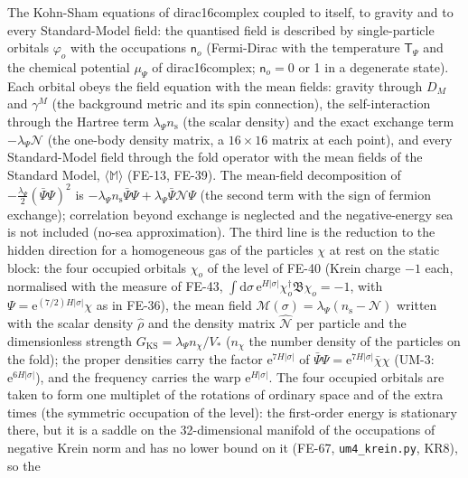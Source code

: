 \documentclass[
  10pt,
]{article}
\begin{document}
The Kohn-Sham equations of dirac16complex coupled to itself, to gravity
and to every Standard-Model field: the quantised field is described by
single-particle orbitals \(\varphi_o\) with the occupations
\(\mathsf{n}_o\) (Fermi-Dirac with the temperature \(\mathsf{T}_\Psi\)
and the chemical potential \(\mu_\Psi\) of dirac16complex;
\(\mathsf{n}_o = 0\) or 1 in a degenerate state). Each orbital obeys the
field equation with the mean fields: gravity through \(D_M\) and
\(\gamma^M\) (the background metric and its spin connection), the
self-interaction through the Hartree term
\(\lambda_\Psi n_{\mathrm{s}}\) (the scalar density) and the exact
exchange term \(-\lambda_\Psi\mathcal{N}\) (the one-body density matrix,
a \(16 \times 16\) matrix at each point), and every Standard-Model field
through the fold operator with the mean fields of the Standard Model,
\(\langle\mathbb{M}\rangle\) (FE-13, FE-39). The mean-field
decomposition of \(-\frac{\lambda_\Psi}{2}(\bar\Psi\Psi)^2\) is
\(-\lambda_\Psi n_{\mathrm{s}}\bar\Psi\Psi + \lambda_\Psi\bar\Psi\mathcal{N}\Psi\)
(the second term with the sign of fermion exchange); correlation beyond
exchange is neglected and the negative-energy sea is not included
(no-sea approximation). The third line is the reduction to the hidden
direction for a homogeneous gas of the particles \(\chi\) at rest on the
static block: the four occupied orbitals \(\chi_o\) of the level of
FE-40 (Krein charge \(-1\) each, normalised with the measure of FE-43,
\(\int\mathrm{d}\sigma\,\mathrm{e}^{H\lvert\sigma\rvert}\chi_o^\dagger\mathfrak{B}\chi_o = -1\),
with \(\Psi = \mathrm{e}^{(7/2)H\lvert\sigma\rvert}\chi\) as in FE-36),
the mean field
\(\mathcal{M}(\sigma) = \lambda_\Psi(n_{\mathrm{s}} - \mathcal{N})\)
written with the scalar density \(\hat\rho\) and the density matrix
\(\hat{\mathcal{N}}\) per particle and the dimensionless strength
\(G_{\mathrm{KS}} = \lambda_\Psi n_\chi/V_*\) (\(n_\chi\) the number
density of the particles on the fold); the proper densities carry the
factor \(\mathrm{e}^{7H\lvert\sigma\rvert}\) of
\(\bar\Psi\Psi = \mathrm{e}^{7H\lvert\sigma\rvert}\bar\chi\chi\) (UM-3:
\(\mathrm{e}^{6H\lvert\sigma\rvert}\)), and the frequency carries the
warp \(\mathrm{e}^{H\lvert\sigma\rvert}\). The four occupied orbitals
are taken to form one multiplet of the rotations of ordinary space and
of the extra times (the symmetric occupation of the level): the
first-order energy is stationary there, but it is a saddle on the
32-dimensional manifold of the occupations of negative Krein norm and
has no lower bound on it (FE-67, \texttt{um4\_krein.py}, KR8), so the
\end{document}
